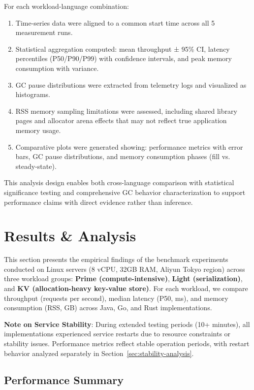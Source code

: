 \documentclass{article}
\begin{document}
For each workload-language combination:
\begin{enumerate}
    \item Time-series data were aligned to a common start time across all 5 measurement runs.
    \item Statistical aggregation computed: mean throughput ± 95\% CI, latency percentiles (P50/P90/P99) with confidence intervals, and peak memory consumption with variance.
    \item GC pause distributions were extracted from telemetry logs and visualized as histograms.
    \item RSS memory sampling limitations were assessed, including shared library pages and allocator arena effects that may not reflect true application memory usage.
    \item Comparative plots were generated showing: performance metrics with error bars, GC pause distributions, and memory consumption phases (fill vs. steady-state).
\end{enumerate}

This analysis design enables both cross-language comparison with statistical significance testing and comprehensive GC behavior characterization to support performance claims with direct evidence rather than inference.

\section{Results \& Analysis}

This section presents the empirical findings of the benchmark experiments conducted on Linux servers (8 vCPU, 32GB RAM, Aliyun Tokyo region) across three workload groups: \textbf{Prime (compute-intensive)}, \textbf{Light (serialization)}, and \textbf{KV (allocation-heavy key-value store)}. For each workload, we compare throughput (requests per second), median latency (P50, ms), and memory consumption (RSS, GB) across Java, Go, and Rust implementations.

\textbf{Note on Service Stability}: During extended testing periods (10+ minutes), all implementations experienced service restarts due to resource constraints or stability issues. Performance metrics reflect stable operation periods, with restart behavior analyzed separately in Section~\ref{sec:stability-analysis}.

\subsection{Performance Summary}
\end{document}
